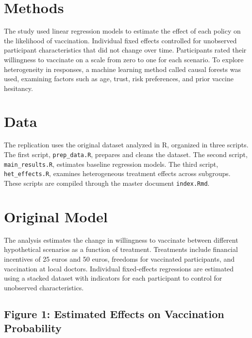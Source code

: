 \documentclass[12pt]{article}
\begin{document}
	\section{Methods}
	
	The study used linear regression models to estimate the effect of each policy on the likelihood of vaccination. Individual fixed effects controlled for unobserved participant characteristics that did not change over time. Participants rated their willingness to vaccinate on a scale from zero to one for each scenario. To explore heterogeneity in responses, a machine learning method called causal forests was used, examining factors such as age, trust, risk preferences, and prior vaccine hesitancy.
	
	\section{Data}
	
	The replication uses the original dataset analyzed in R, organized in three scripts. The first script, \texttt{prep\_data.R}, prepares and cleans the dataset. The second script, \texttt{main\_results.R}, estimates baseline regression models. The third script, \texttt{het\_effects.R}, examines heterogeneous treatment effects across subgroups. These scripts are compiled through the master document \texttt{index.Rmd}.
	
	
	
	\section{Original Model}
	
	The analysis estimates the change in willingness to vaccinate between different hypothetical scenarios as a function of treatment. Treatments include financial incentives of 25 euros and 50 euros, freedoms for vaccinated participants, and vaccination at local doctors. Individual fixed-effects regressions are estimated using a stacked dataset with indicators for each participant to control for unobserved characteristics.
	
	
	
	\subsection{Figure 1: Estimated Effects on Vaccination Probability}
	
\end{document}
